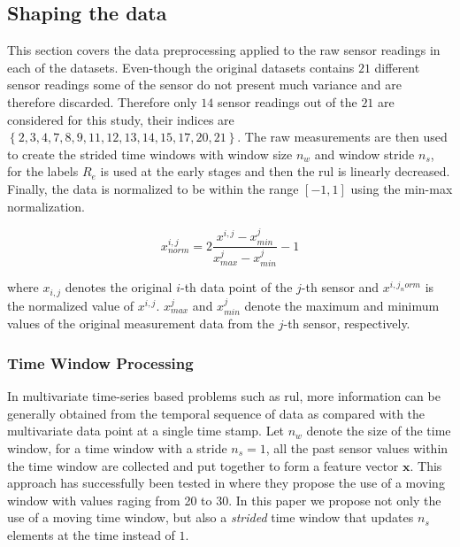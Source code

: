 \subsection{Shaping the data}

This section covers the data preprocessing applied to the raw sensor readings in each of the datasets. Even-though the original datasets contains $21$ different sensor readings some of the sensor do not present much variance and are therefore discarded. Therefore only $14$ sensor readings out of the $21$ are considered for this study, their indices are $\left\lbrace 2, 3, 4, 7, 8, 9, 11, 12, 13, 14, 15, 17, 20, 21 \right\rbrace$. The raw measurements are then used to create the strided time windows with window size $n_w$ and window stride $n_s$, for the labels $R_e$ is used at the early stages and then the \gls{rul} is linearly decreased. Finally, the data is normalized to be within the range $\left[ -1,1 \right]$ using the min-max normalization.

\begin{equation}
x^{i,j}_{norm} = 2 \frac{x^{i,j} - x^{j}_{min}}{x^{j}_{max} - x^{j}_{min}} - 1
\label{eq:min_max_norm}
\end{equation}

where $x_{i,j}$ denotes the original $i$-th data point of the $j$-th sensor and $x^{i,j_norm}$ is the normalized value of $x^{i,j}$.  $x^{j}_{max}$ and $x^{j}_{min}$ denote the maximum and minimum values of the original measurement data from the $j$-th sensor, respectively. 

\subsubsection{Time Window Processing}

In multivariate time-series based problems such as \gls{rul}, more information can be generally obtained from the temporal sequence of data as compared with the multivariate data point at a single time stamp. Let $n_w$ denote the size of the time window, for a time window with a stride $n_s = 1$, all the past sensor values within the time window are collected and put together to form a feature vector $\mathbf{x}$. This approach has successfully been tested in \cite{Li2018, Lim2016} where they propose the use of a moving window with values raging from 20 to 30. In this paper we propose not only the use of a moving time window, but also a \textit{strided} time window that updates $n_s$ elements at the time instead of $1$. 

